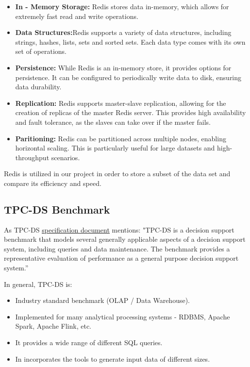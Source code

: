 \documentclass[conference]{IEEEtran}
\begin{document}
\begin{itemize}
    \item \textbf{In - Memory Storage:} Redis stores data in-memory, which allows for extremely fast read and write operations.
    \item \textbf{Data Structures:}Redis supports a variety of data structures, including strings, hashes, lists, sets and sorted sets. Each data type comes with its own set of operations.
    \item \textbf{Persistence:} While Redis is an in-memory store, it provides options for persistence. It can be configured to periodically write data to disk, ensuring data durability.
    \item \textbf{Replication:} Redis supports master-slave replication, allowing for the creation of replicas of the master Redis server. 
    This provides high availability and fault tolerance, as the slaves can take over if the master fails.
    \item \textbf{Paritioning:} Redis can be partitioned across multiple nodes, enabling horizontal scaling. This is particularly useful for large datasets and high-throughput scenarios.
\end{itemize}

Redis is utilized in our project in order to store a subset of the data set and compare its efficiency and speed.

\subsection{TPC-DS Benchmark}

As TPC-DS \textcolor{linkblue}{\underline{\href{https://www.tpc.org/tpc_documents_current_versions/current_specifications5.asp}{specification document}}} mentions: "TPC-DS is a decision support
benchmark that models several generally applicable aspects of a decision support system, including queries and data maintenance. The benchmark provides a representative evaluation 
of performance as a general purpose decision support system.”

In general, TPC-DS is:

\begin{itemize}
    \item Industry standard benchmark (OLAP / Data Warehouse).
    \item Implemented for many analytical processing systems - RDBMS, Apache Spark, Apache Flink, etc. 
    \item It provides a wide range of different SQL queries.
    \item In incorporates the tools to generate input data of different sizes.
\end{itemize}
\end{document}
